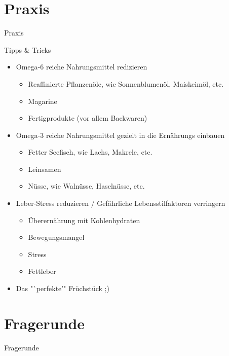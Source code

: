 \documentclass[xcolor=dvipsnames]{beamer}
\begin{document}
    \section{Praxis}
    {
        \begin{frame}
            \begin{center}
                \Huge Praxis
            \end{center}
        \end{frame}
    }

    \begin{frame}{Tipps \& Tricks}
        \begin{itemize}
            \setlength\itemsep{1em}
            \item Omega-6 reiche Nahrungsmittel redizieren
            \begin{itemize}
                \item Reaffinierte Pflanzenöle, wie Sonnenblumenöl, Maiskeimöl, etc.
                \item Magarine
                \item Fertigprodukte (vor allem Backwaren)
            \end{itemize}
            \item Omega-3 reiche Nahrungsmittel gezielt in die Ernährungs einbauen
            \begin{itemize}
                \item Fetter Seefisch, wie Lachs, Makrele, etc.
                \item Leinsamen
                \item Nüsse, wie Walnüsse, Haselnüsse, etc.
            \end{itemize}
            \item Leber-Stress reduzieren / Gefährliche Lebensstilfaktoren verringern
            \begin{itemize}
                \item Überernährung mit Kohlenhydraten
                \item Bewegungsmangel
                \item Stress
                \item Fettleber
            \end{itemize}
            \item Das "`perfekte'" Früchstück ;)
        \end{itemize}
    \end{frame}

    \section{Fragerunde}
    {
        \begin{frame}
            \begin{center}
                \Huge Fragerunde
            \end{center}
        \end{frame}
    }
\end{document}

